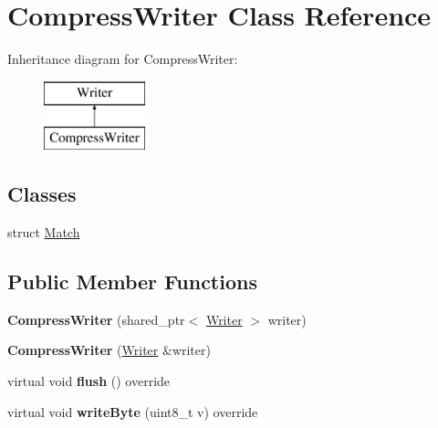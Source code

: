 \hypertarget{classCompressWriter}{\section{Compress\+Writer Class Reference}
\label{classCompressWriter}
}
Inheritance diagram for Compress\+Writer\+:\begin{figure}[H]
\begin{center}
\leavevmode
\includegraphics[height=2.000000cm]{classCompressWriter}
\end{center}
\end{figure}
\subsection*{Classes}
\begin{DoxyCompactItemize}
\item 
struct \hyperlink{structCompressWriter_1_1Match}{Match}
\end{DoxyCompactItemize}
\subsection*{Public Member Functions}
\begin{DoxyCompactItemize}
\item 
\hypertarget{classCompressWriter_a02f579d91e6ab012bbdba90481d327ef}{{\bfseries Compress\+Writer} (shared\+\_\+ptr$<$ \hyperlink{classWriter}{Writer} $>$ writer)}\label{classCompressWriter_a02f579d91e6ab012bbdba90481d327ef}

\item 
\hypertarget{classCompressWriter_a3e8580dad4dc5585d5f7af073d23e64b}{{\bfseries Compress\+Writer} (\hyperlink{classWriter}{Writer} \&writer)}\label{classCompressWriter_a3e8580dad4dc5585d5f7af073d23e64b}

\item 
\hypertarget{classCompressWriter_a23ba48ca17b9781ff531f7baeb08773e}{virtual void {\bfseries flush} () override}\label{classCompressWriter_a23ba48ca17b9781ff531f7baeb08773e}

\item 
\hypertarget{classCompressWriter_a3151658fd8e01af378e1d2ab12a24019}{virtual void {\bfseries write\+Byte} (uint8\+\_\+t v) override}\label{classCompressWriter_a3151658fd8e01af378e1d2ab12a24019}

\end{DoxyCompactItemize}
